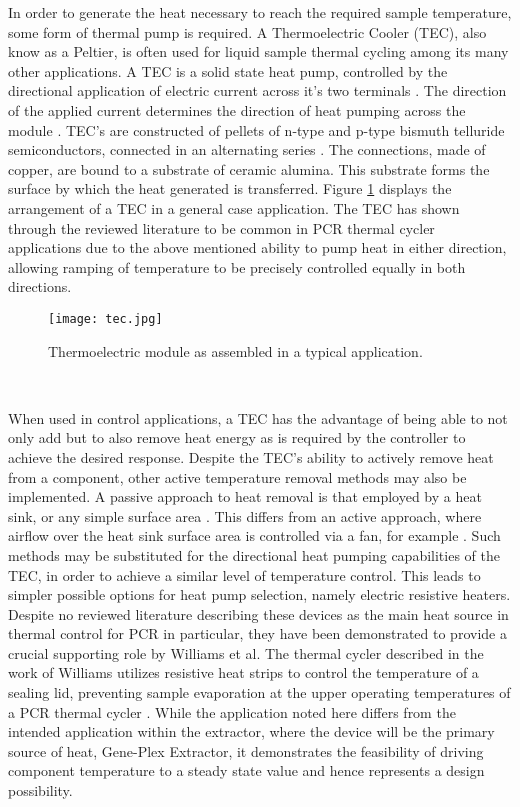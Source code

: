 In order to generate the heat necessary to reach the required sample temperature, some form of thermal pump is required. A Thermoelectric Cooler (TEC), also know as a Peltier, is often used for liquid sample thermal cycling \cite{12436620} among its many other applications. A TEC is a solid state heat pump, controlled by the directional application of electric current across it's two terminals \cite{20160801988967}. The direction of the applied current determines the direction of heat pumping across the module \cite{20160801988967}. TEC's are constructed of pellets of n-type and p-type bismuth telluride semiconductors, connected in an alternating series \cite{6464884}. The connections, made of copper, are bound to a substrate of ceramic alumina. This substrate forms the surface by which the heat generated is transferred. Figure \ref{fig:tec} displays the arrangement of a TEC in a general case application. The TEC has shown through the reviewed literature to be common in PCR thermal cycler applications due to the above mentioned ability to pump heat in either direction, allowing ramping of temperature to be precisely controlled equally in both directions.\\

\begin{figure}[!htb]
	\centering
	\texttt{[image: tec.jpg]}
	\caption[Thermoelectric Module Application.]{Thermoelectric module as assembled in a typical application. \cite{Ferrotec}}
	\label{fig:tec}
\end{figure} 
\FloatBarrier

When used in control applications, a TEC has the advantage of being able to not only add but to also remove heat energy as is required by the controller to achieve the desired response. Despite the TEC's ability to actively remove heat from a component, other active temperature removal methods may also be implemented. A passive approach to heat removal is that employed by a heat sink, or any simple surface area \cite{2006289990179}\cite{20144600208116}. This differs from an active approach, where airflow over the heat sink surface area is controlled via a fan, for example \cite{2006289990179}. Such methods may be substituted for the directional heat pumping capabilities of the TEC, in order to achieve a similar level of temperature control. This leads to simpler possible options for heat pump selection, namely electric resistive heaters. Despite no reviewed literature describing these devices as the main heat source in thermal control for PCR in particular, they have been demonstrated to provide a crucial supporting role by Williams et al. The thermal cycler described in the work of Williams utilizes resistive heat strips to control the temperature of a sealing lid, preventing sample evaporation at the upper operating temperatures of a PCR thermal cycler \cite{7238517}. While the application noted here differs from the intended application within the extractor, where the device will be the primary source of heat, Gene-Plex Extractor, it demonstrates the feasibility of driving component temperature to a steady state value and hence represents a design possibility.\\

